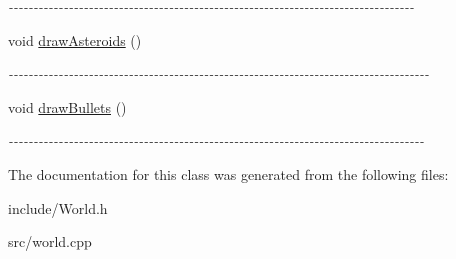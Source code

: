 \begin{DoxyCompactItemize}
\begin{DoxyCompactList}\small\item\em -\/-\/-\/-\/-\/-\/-\/-\/-\/-\/-\/-\/-\/-\/-\/-\/-\/-\/-\/-\/-\/-\/-\/-\/-\/-\/-\/-\/-\/-\/-\/-\/-\/-\/-\/-\/-\/-\/-\/-\/-\/-\/-\/-\/-\/-\/-\/-\/-\/-\/-\/-\/-\/-\/-\/-\/-\/-\/-\/-\/-\/-\/-\/-\/-\/-\/-\/-\/-\/-\/-\/-\/-\/-\/-\/-\/-\/-\/-\/-\/-\/ \item\end{DoxyCompactList}\item 
\hypertarget{classWorld_ae1c9ae7fa1d8201cf49cbea092efde97}{
void \hyperlink{classWorld_ae1c9ae7fa1d8201cf49cbea092efde97}{drawAsteroids} ()}
\label{classWorld_ae1c9ae7fa1d8201cf49cbea092efde97}

\begin{DoxyCompactList}\small\item\em -\/-\/-\/-\/-\/-\/-\/-\/-\/-\/-\/-\/-\/-\/-\/-\/-\/-\/-\/-\/-\/-\/-\/-\/-\/-\/-\/-\/-\/-\/-\/-\/-\/-\/-\/-\/-\/-\/-\/-\/-\/-\/-\/-\/-\/-\/-\/-\/-\/-\/-\/-\/-\/-\/-\/-\/-\/-\/-\/-\/-\/-\/-\/-\/-\/-\/-\/-\/-\/-\/-\/-\/-\/-\/-\/-\/-\/-\/-\/-\/-\/-\/-\/-\/ \item\end{DoxyCompactList}\item 
\hypertarget{classWorld_a7514ce95a0d7925260e0d9a80d99e4ba}{
void \hyperlink{classWorld_a7514ce95a0d7925260e0d9a80d99e4ba}{drawBullets} ()}
\label{classWorld_a7514ce95a0d7925260e0d9a80d99e4ba}

\begin{DoxyCompactList}\small\item\em -\/-\/-\/-\/-\/-\/-\/-\/-\/-\/-\/-\/-\/-\/-\/-\/-\/-\/-\/-\/-\/-\/-\/-\/-\/-\/-\/-\/-\/-\/-\/-\/-\/-\/-\/-\/-\/-\/-\/-\/-\/-\/-\/-\/-\/-\/-\/-\/-\/-\/-\/-\/-\/-\/-\/-\/-\/-\/-\/-\/-\/-\/-\/-\/-\/-\/-\/-\/-\/-\/-\/-\/-\/-\/-\/-\/-\/-\/-\/-\/-\/-\/-\/ \item\end{DoxyCompactList}\end{DoxyCompactItemize}


The documentation for this class was generated from the following files:\begin{DoxyCompactItemize}
\item 
include/World.h\item 
src/world.cpp\end{DoxyCompactItemize}
